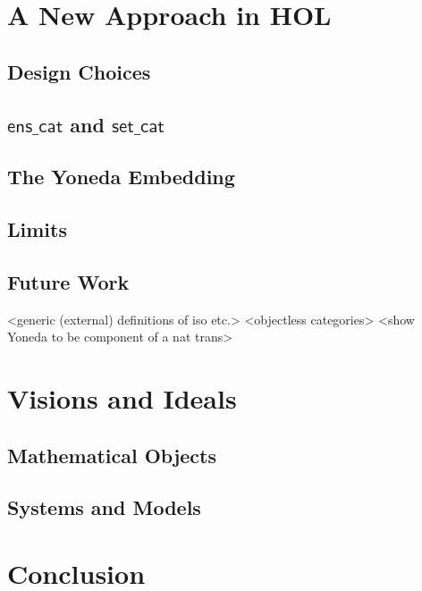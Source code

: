 \documentclass{article}
\begin{document}
\section{A New Approach in HOL}
\subsection{Design Choices}
\subsection{$\mathsf{ens\_cat}$ and $\mathsf{set\_cat}$}
\subsection{The Yoneda Embedding}
\subsection{Limits}
\subsection{Future Work}
<generic (external) definitions of iso etc.>
<objectless categories>
<show Yoneda to be component of a nat trans>
\section{Visions and Ideals}
\subsection{Mathematical Objects}
\subsection{Systems and Models}
\section{Conclusion}


\end{document}

